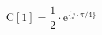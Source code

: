 \begin{center}
\[
\textrm{C}[1] = \frac{1}{2} \cdot \textrm{e}^{\{ j \cdot \pi/4 \}}
\]
\end{center}
